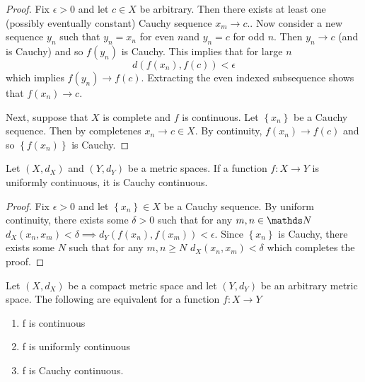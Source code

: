 \begin{proof}
Fix $\epsilon>0$ and let $c\in X$ be arbitrary. Then there exists
at least one (possibly eventually constant) Cauchy sequence $x_{m}\to c.$.
Now consider a new sequence $y_{n}$ such that $y_{n}=x_{n}$ for
even $n$and $y_{n}=c$ for odd $n.$ Then $y_{n}\to c$ (and is Cauchy)
and so $f\left(y_{n}\right)$ is Cauchy. This implies that for large
$n$
\[
d\left(f\left(x_{n}\right),f\left(c\right)\right)<\epsilon
\]
which implies $f\left(y_{n}\right)\to f\left(c\right).$ Extracting
the even indexed subsequence shows that $f\left(x_{n}\right)\to c.$

Next, suppose that $X$ is complete and $f$ is continuous. Let $\left\{ x_{n}\right\} $
be a Cauchy sequence. Then by completenes $x_{n}\to c\in X$. By continuity,
$f\left(x_{n}\right)\to f\left(c\right)$ and so $\left\{ f\left(x_{n}\right)\right\} $
is Cauchy.
\end{proof}
\begin{prop}
\label{prop:uniformContinuityImpliesCauchyContinuity}Let $\left(X,d_{X}\right)$
and $\left(Y,d_{Y}\right)$ be a metric spaces. If a function $f:X\to Y$
is uniformly continuous, it is Cauchy continuous.
\end{prop}

\begin{proof}
Fix $\epsilon>0$ and let $\left\{ x_{n}\right\} \in X$ be a Cauchy
sequence. By uniform continuity, there exists some $\delta>0$ such
that for any $m,n\in\N$ $d_{X}\left(x_{n},x_{m}\right)<\delta\implies d_{Y}\left(f\left(x_{n}\right),f\left(x_{m}\right)\right)<\epsilon.$
Since $\left\{ x_{n}\right\} $ is Cauchy, there exists some $N$
such that for any $m,n\geq N$ $d_{X}\left(x_{n},x_{m}\right)<\delta$
which completes the proof.
\end{proof}
\begin{thm}
\label{thm:compactUniformContinuity}Let $\left(X,d_{X}\right)$ be
a compact metric space and let $\left(Y,d_{Y}\right)$ be an arbitrary
metric space. The following are equivalent for a function $f:X\to Y$

\begin{enumerate}[label=(\roman*),leftmargin=.1\linewidth,rightmargin=.4\linewidth]
	\item f is continuous
	\item f is uniformly continuous
	\item f is Cauchy continuous.
\end{enumerate}
\end{thm}

